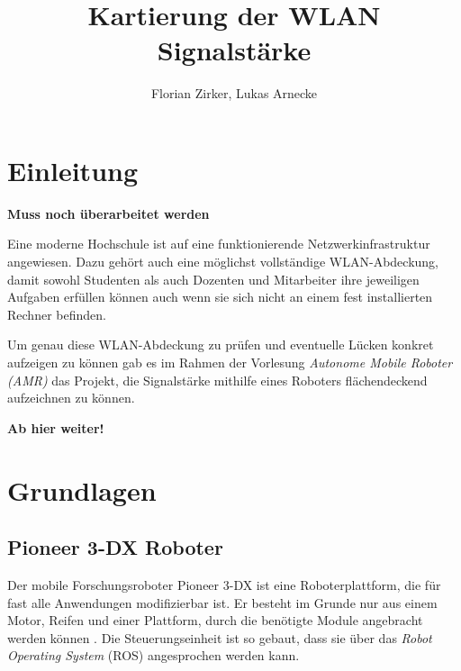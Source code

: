 \documentclass{scrartcl}%
\begin{document}
\titlehead{AMR}%
\subject{Projektbericht AMR}%
\title{Kartierung der WLAN Signalstärke}%
\author{Florian Zirker, Lukas Arnecke}%
\publishers{Prof. Dr. Thomas Ihme}%
\maketitle%
\tableofcontents

\section{Einleitung}
\textbf{Muss noch überarbeitet werden}

Eine moderne Hochschule ist auf eine funktionierende Netzwerkinfrastruktur angewiesen. Dazu gehört auch eine möglichst vollständige WLAN-Abdeckung, damit sowohl Studenten als auch Dozenten und Mitarbeiter ihre jeweiligen Aufgaben erfüllen können auch wenn sie sich nicht an einem fest installierten Rechner befinden.

Um genau diese WLAN-Abdeckung zu prüfen und eventuelle Lücken konkret aufzeigen zu können gab es im Rahmen der Vorlesung \textit{Autonome Mobile Roboter (AMR)} das Projekt, die Signalstärke mithilfe eines Roboters flächendeckend aufzeichnen zu können.

\textbf{Ab hier weiter!}

\newpage
\section{Grundlagen}
\subsection{Pioneer 3-DX Roboter}
Der mobile Forschungsroboter Pioneer 3-DX ist eine Roboterplattform, die für fast alle Anwendungen modifizierbar ist. Er besteht im Grunde nur aus einem Motor, Reifen und einer Plattform, durch die benötigte Module angebracht werden können \cite{pioneer}. Die Steuerungseinheit ist so gebaut, dass sie über das \textit{Robot Operating System} (ROS) angesprochen werden kann.
\end{document}
